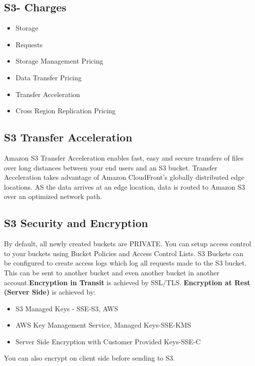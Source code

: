 \documentclass{article}
\begin{document}
	\subsection{S3- Charges}
	\begin{itemize}
	\item
	Storage
	
	\item
	Requests
	
	\item
	Storage Management Pricing
	
	\item
	Data Transfer Pricing
	
	\item
	Transfer Acceleration
	
	\item
	Cross Region Replication Pricing
	\end{itemize}
	
	\subsection{S3 Transfer Acceleration}
	Amazon S3 Transfer Acceleration enables fast, easy and secure transfers of files over long distances between your end users and an S3 bucket. Transfer Acceleration takes advantage of Amazon CloudFront's globally distributed edge locations. AS the data arrives at an edge location, data is routed to Amazon S3 over an optimized network path.
	
	\subsection{S3 Security and Encryption}
	By default, all newly created buckets are PRIVATE. You can setup access control to your buckets using Bucket Policies and Access Control Lists. S3 Buckets can be configured to create access logs which log all requests made to the S3 bucket. This can be sent to another bucket and even another bucket in another account.\textbf{Encryption in Transit} is achieved by SSL/TLS. \textbf{Encryption at Rest (Server Side)} is achieved by:
	\begin{itemize}
	\item
	S3 Managed Keys - SSE-S3, AWS
	
	\item
	AWS Key Management Service, Managed Keys-SSE-KMS
	
	\item
	Server Side Encryption with Customer Provided Keys-SSE-C
	\end{itemize}	 
	You can also encrypt on client side before sending to S3.
\end{document}
